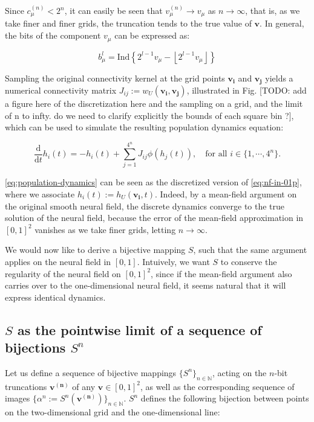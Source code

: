 \documentclass[10pt,letterpaper]{article}
\def\d{\mathrm d}
\renewcommand{\vec}[1]{\boldsymbol{#1}}
\begin{document}
Since $c_\mu^{(n)} < 2^n$, it can easily be seen that $v_\mu^{(n)} \to v_\mu$ as $n\to\infty$, that is, as we take finer and finer grids, the truncation tends to the true value of $\vec{v}$. In general, the bits of the component $v_\mu$ can be expressed as:

\begin{equation*}
b_\mu^l = \mathrm{Ind} \left\{ 2^{l-1}v_\mu - \left\lfloor 2^{l-1}v_\mu \right\rfloor \right\}
\end{equation*}

Sampling the original connectivity kernel at the grid points $\vec{v_i}$ and $\vec{v_j}$ yields a numerical connectivity matrix $J_{ij} := w_U(\vec{v_i}, \vec{v_j})$, illustrated in Fig. [TODO: add a figure here of the discretization here and the sampling on a grid, and the limit of n to infty. do we need to clarify explicitly the bounds of each square bin ?], which can be used to simulate the resulting population dynamics equation:

\begin{equation} \label{eq:population-dynamics}
\frac{\d}{\d t} h_i(t) = -h_i(t) + \sum_{j=1}^{4^n} J_{ij} \phi(h_j(t)), \quad \text{for all } i \in \{1,\cdots,4^n\}.
\end{equation}

\autoref{eq:population-dynamics} can be seen as the discretized version of \autoref{eq:nf-in-01p}, where we associate $h_i(t) := h_U(\vec{v_i}, t)$. Indeed, by a mean-field argument on the original smooth neural field, the discrete dynamics converge to the true solution of the neural field, because the error of the mean-field approximation in $[0,1]^2$ vanishes as we take finer grids, letting $n \to \infty$.

We would now like to derive a bijective mapping $S$, such that the same argument applies on the neural field in $[0,1]$. Intuively, we want $S$ to conserve the regularity of the neural field on $[0,1]^2$, since if the mean-field argument also carries over to the one-dimensional neural field, it seems natural that it will express identical dynamics.

\subsection{$S$ as the pointwise limit of a sequence of bijections $S^n$}

Let us define a sequence of bijective mappings $\{S^n\}_{n \in \mathbb N}$, acting on the $n$-bit truncations $\vec{v^{(n)}}$ of any $\vec{v} \in [0,1]^2$, as well as the corresponding sequence of images $\{\alpha^n := S^n(\vec{v^{(n)}})\}_{n \in \mathbb N}$. $S^n$ defines the following bijection between points on the two-dimensional grid and the one-dimensional line:
\end{document}
